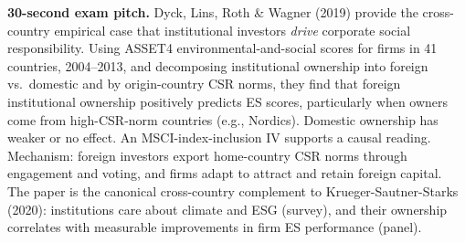 \documentclass[11pt]{article}
\begin{document}
\begin{keybox}
\textbf{30-second exam pitch.} Dyck, Lins, Roth \& Wagner (2019) provide the cross-country empirical case that institutional investors \emph{drive} corporate social responsibility. Using ASSET4 environmental-and-social scores for firms in 41 countries, 2004--2013, and decomposing institutional ownership into foreign vs.\ domestic and by origin-country CSR norms, they find that foreign institutional ownership positively predicts ES scores, particularly when owners come from high-CSR-norm countries (e.g., Nordics). Domestic ownership has weaker or no effect. An MSCI-index-inclusion IV supports a causal reading. Mechanism: foreign investors export home-country CSR norms through engagement and voting, and firms adapt to attract and retain foreign capital. The paper is the canonical cross-country complement to Krueger-Sautner-Starks (2020): institutions care about climate and ESG (survey), and their ownership correlates with measurable improvements in firm ES performance (panel).
\end{keybox}
\end{document}
